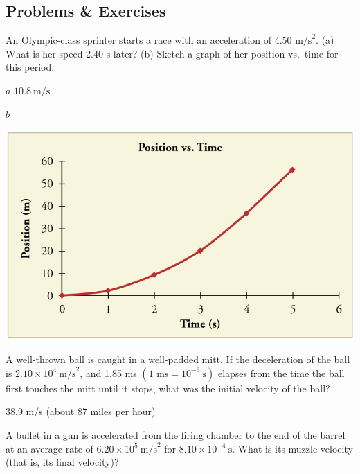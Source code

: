 \documentclass[
]{book}
\begin{document}
\hypertarget{fs-id1164906440394}{}
\hypertarget{problems-exercises-3}{%
\subsection{Problems \& Exercises}\label{problems-exercises-3}}

\hypertarget{fs-id1164906440403}{}
\leavevmode{}%
An Olympic-class sprinter starts a race with an acceleration of
\({4\text{.}\text{50\ m/s}^{2}}{}\). (a) What is her speed 2.40 s later?
(b) Sketch a graph of her position vs.~time for this period.

\leavevmode{}%
\(a\) \({\text{10}\text{.}8\ \text{m/s}}{}\)

\(b\)

\includegraphics{images/unnumbered_art_p44.jpg}

\hypertarget{fs-id1164906478917}{}
\leavevmode{}%
A well-thrown ball is caught in a well-padded mitt. If the deceleration
of the ball is
\({2\text{.}\text{10} \times \text{10}^{4}\ \text{m/s}^{2}}{}\), and 1.85
ms \({({\text{1\ ms} = \text{10}^{- 3}}\ \text{s})}{}\) elapses from the
time the ball first touches the mitt until it stops, what was the
initial velocity of the ball?

\leavevmode{}%
38.9 m/s (about 87 miles per hour)

\hypertarget{fs-id1164906452216}{}
\leavevmode{}%
A bullet in a gun is accelerated from the firing chamber to the end of
the barrel at an average rate of
\({6\text{.20} \times \text{10}^{5}\ \text{m/s}^{2}}{}\) for
\({8\text{.}\text{10} \times \text{10}^{- 4}\ \text{s}}{}\). What is its
muzzle velocity (that is, its final velocity)?
\end{document}
